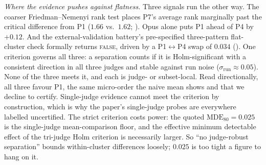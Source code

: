 \documentclass[11pt]{article}
\begin{document}
\emph{Where the evidence pushes against flatness.} Three signals run the other way. The coarser Friedman--Nemenyi
rank test places P7's average rank marginally past the critical difference from P1
($1.66$ vs.\ $1.62$; ). Opus alone puts P1 ahead of P4 by $+0.12$. And the
external-validation battery's pre-specified three-pattern flat-cluster check formally
returns \textsc{false}, driven by a P1$\leftrightarrow$P4 swap of $0.034$
(). One criterion governs all three: a separation counts if it is
Holm-significant with a consistent direction in all three judges and stable against run
noise ($\sigma_{\text{run}}\approx0.05$). None of the three meets it, and each is judge-
or subset-local. Read directionally, all three favour P1, the same micro-order the naive
mean shows and that we decline to certify. Single-judge evidence cannot meet the
criterion by construction, which is why the paper's single-judge probes are everywhere
labelled uncertified. The strict criterion costs power: the quoted $\text{MDE}_{80}=0.025$
is the single-judge mean-comparison floor, and the effective minimum detectable effect
of the tri-judge Holm criterion is necessarily larger. So ``no judge-robust separation''
bounds within-cluster differences loosely; $0.025$ is too tight a figure to hang on it.
\end{document}

